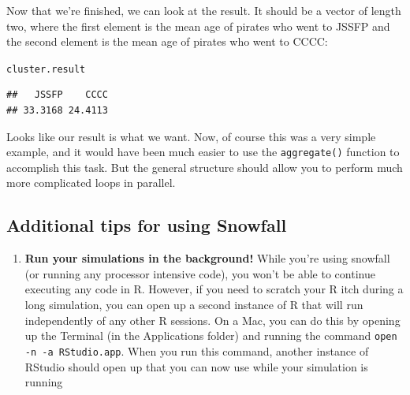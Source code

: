\documentclass{tufte-book}\usepackage[]{graphicx}\usepackage[]{color}
\makeatletter
\newcommand{\hlstd}[1]{\textcolor[rgb]{0.345,0.345,0.345}{#1}}%
\newenvironment{kframe}{%
 \def\at@end@of@kframe{}%
 \ifinner\ifhmode%
  \def\at@end@of@kframe{\end{minipage}}%
  \begin{minipage}{\columnwidth}%
 \fi\fi%
 \def\FrameCommand##1{\hskip\@totalleftmargin \hskip-\fboxsep
 \colorbox{shadecolor}{##1}\hskip-\fboxsep
     \hskip-\linewidth \hskip-\@totalleftmargin \hskip\columnwidth}%
 \MakeFramed {\advance\hsize-\width
   \@totalleftmargin\z@ \linewidth\hsize
   \@setminipage}}%
 {\par\unskip\endMakeFramed%
 \at@end@of@kframe}
\newenvironment{knitrout}{}{} %
\makeatother
\begin{document}
\begin{footnotesize}
\begin{knitrout}
\begin{kframe}
{\ttfamily\noindent\itshape\color{messagecolor}{\#\# \\\#\# Stopping cluster}}\end{kframe}
\end{knitrout}

Now that we're finished, we can look at the result. It should be a vector of length two, where the first element is the mean age of pirates who went to JSSFP and the second element is the mean age of pirates who went to CCCC:

\begin{knitrout}
\color{fgcolor}\begin{kframe}
\begin{alltt}
\hlstd{cluster.result}
\end{alltt}
\begin{verbatim}
##   JSSFP    CCCC 
## 33.3168 24.4113
\end{verbatim}
\end{kframe}
\end{knitrout}

Looks like our result is what we want. Now, of course this was a very simple example, and it would have been much easier to use the \texttt{aggregate()} function to accomplish this task. But the general structure should allow you to perform much more complicated loops in parallel. 

\subsection{Additional tips for using Snowfall}

\begin{enumerate}

\item \textbf{Run your simulations in the background!} While you're using snowfall (or running any processor intensive code), you won't be able to continue executing any code in R. However, if you need to scratch your R itch during a long simulation, you can open up a second instance of R that will run independently of any other R sessions. On a Mac, you can do this by opening up the Terminal (in the Applications folder) and running the command \texttt{open -n -a RStudio.app}. When you run this command, another instance of RStudio should open up that you can now use while your simulation is running


\end{enumerate}
\end{footnotesize}
\end{document}
